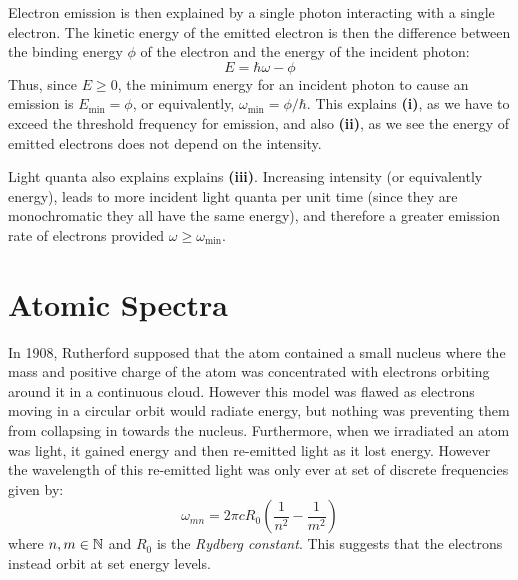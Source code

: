 \documentclass[../main.tex]{subfiles}
\begin{document}
Electron emission is then explained by a single photon interacting with a single electron.
The kinetic energy of the emitted electron is then the difference between the binding energy $\phi$ of the electron and the energy of the incident photon:
\[
  E = \hbar \omega - \phi
\]
Thus, since $E \geq 0$, the minimum energy for an incident photon to cause an emission is $E_{\text{min}} = \phi$, or equivalently, $\omega_{\text{min}} = \phi / \hbar$.
This explains \textbf{(i)}, as we have to exceed the threshold frequency for emission, and also \textbf{(ii)}, as we see the energy of emitted electrons does not depend on the intensity.

Light quanta also explains explains \textbf{(iii)}.
Increasing intensity (or equivalently energy), leads to more incident light quanta per unit time (since they are monochromatic they all have the same energy), and therefore a greater emission rate of electrons provided $\omega \geq \omega_{\text{min}}$.
\section{Atomic Spectra}
In 1908, Rutherford supposed that the atom contained a small nucleus where the mass and positive charge of the atom was concentrated with electrons orbiting around it in a continuous cloud.
However this model was flawed as electrons moving in a circular orbit would radiate energy, but nothing was preventing them from collapsing in towards the nucleus.
Furthermore, when we irradiated an atom was light, it gained energy and then re-emitted light as it lost energy.
However the wavelength of this re-emitted light was only ever at set of discrete frequencies given by:
\begin{equation}
  \omega_{mn} = 2\pi c R_0 \left(\frac{1}{n^2} - \frac{1}{m^2}\right) \label{reEmittedFreq}
\end{equation}
where $n, m \in \mathbb{N}$ and $R_0$ is the \textit{Rydberg constant}.
This suggests that the electrons instead orbit at set energy levels.
\end{document}
